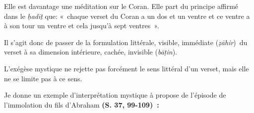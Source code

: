 
Elle est davantage une méditation sur le Coran. Elle part du principe
affirmé dans le \emph{ḥadīṯ} que: «~chaque verset du Coran a un dos et
un ventre et ce ventre a à son tour un ventre et cela jusqu'à sept
ventres~». 
\begin{Def}
Il s'agit donc de passer de la formulation littérale,
visible, immédiate (\emph{ẓāhir})~du verset à sa dimension intérieure,
cachée, invisible (\emph{bāṭin}). 
\end{Def}
L'exégèse mystique ne rejette pas
forcément le sens littéral d'un verset, mais elle ne se limite pas à ce
sens.

Je donne un exemple d'interprétation mystique à propose de l'épisode de
l'immolation du fils d'Abraham \textbf{(S. 37, 99-109)~:}

